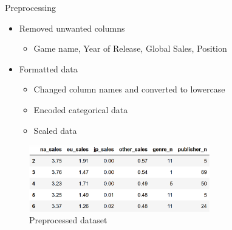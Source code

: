 \documentclass{beamer}
\begin{document}

\begin{frame}{Preprocessing}


\begin{itemize}
\item Removed unwanted columns
\begin{itemize}
    \item Game name, Year of Release, Global Sales, Position
\end{itemize}
\vspace{3mm}
\item Formatted data
\begin{itemize}
    \item Changed column names and converted to lowercase
    \item Encoded categorical data
    \item Scaled data
\end{itemize}
\end{itemize}

\vspace{3mm}

\begin{figure}
\centering
    \includegraphics[width=0.7\textwidth]{img/formatted_data.png}
        \vspace{-2mm}
    \caption{Preprocessed dataset}
\end{figure}


\end{frame}

\end{document}
